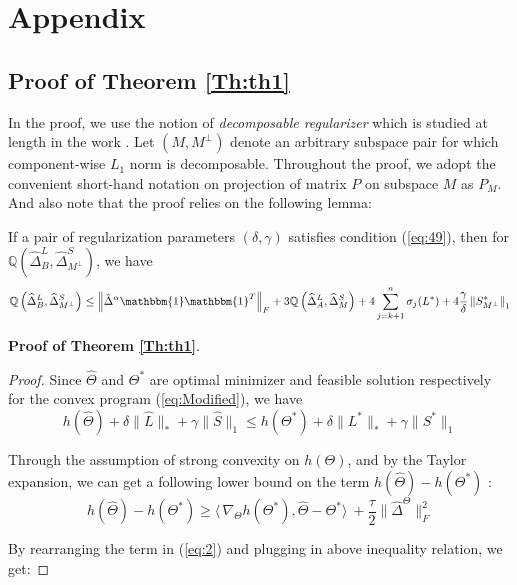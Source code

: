 \documentclass[AMS,STIX1COL]{WileyNJD-v2}
\begin{document}
{\section{Appendix}
\subsection{Proof of Theorem \ref{Th:th1}}

In the proof, we use the notion of \emph{decomposable regularizer} which is studied at length in the work \cite{negahban2012unified}. Let $(M,M^{\perp})$ denote an arbitrary subspace pair for which component-wise $L_{1}$ norm is decomposable. Throughout the proof, we adopt the convenient short-hand notation on projection of matrix $P$ on subspace $M$ as $P_{M}$. And also note that the proof relies on the following lemma:

\begin{lemma} \label{le:le1}
If a pair of regularization parameters $(\delta,\gamma)$ satisfies condition (\ref{eq:49}), then for $\mathbb{Q}\left(\widehat{\Delta}^L_{B},\widehat{\Delta}^S_{M^\perp}\right)$, we have
\[
    \mathbb{Q}\left(\widehat{\Delta}^L_{B},\widehat{\Delta}^S_{M^\perp}\right) \leq
    \left\|\hat{\Delta}^{\alpha}\mathbbm{1}\mathbbm{1}^T\right\|_{F} +
    3\mathbb{Q}\left(\widehat{\Delta}^{L}_{A},\widehat{\Delta}^{S}_{M}\right)+4 \sum_{j=k+1}^{n} \sigma_{j}(L^{*}) + 4\frac{\gamma}{\delta}
    \left\|S^{*}_{M^\perp}\right\|_{1}
\]
\end{lemma}

\noindent\textbf{Proof of Theorem \ref{Th:th1}}.
\begin{proof}
Since $\widehat{\Theta}$ and $\Theta^{*}$ are optimal minimizer and feasible solution respectively for the convex program (\ref{eq:Modified}), we have
\begin{equation}\label{eq:2}
    h(\widehat{\Theta}) + \delta\|\widehat{L}\|_{*} + \gamma\|\widehat{S}\|_{1} \leq
     h(\Theta^{*}) + \delta\|{L^{*}}\|_{*} + \gamma\|{S}^{*}\|_{1}
\end{equation}

Through the assumption of strong convexity on $h(\Theta)$, and by the Taylor expansion, we can get a following lower bound on the term $h(\widehat{\Theta})-h(\Theta^{*})$ :
\[
h(\widehat{\Theta})-h(\Theta^{*}) \geq
\langle\, \nabla_{\Theta}h(\Theta^{*}),\widehat{\Theta}-\Theta^{*}\rangle\ + \frac{\tau}{2}\|\widehat{\Delta}^{\Theta}\|_{F}^{2}
\]

By rearranging the term in (\ref{eq:2}) and plugging in above inequality relation, we get:


\end{proof}}
\end{document}
